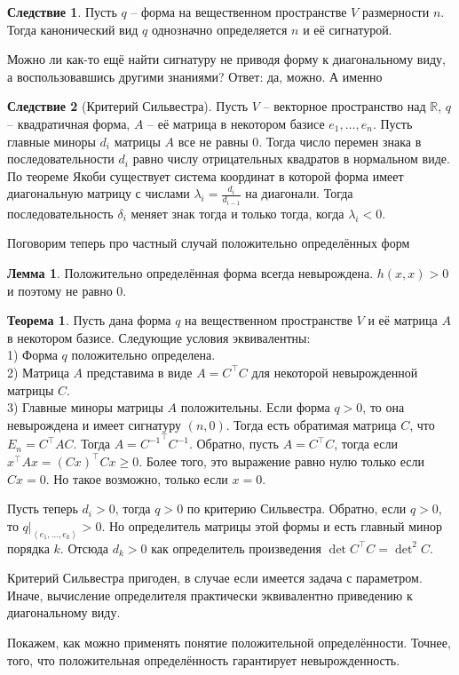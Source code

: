 \documentclass[10pt,a4paper,oneside]{book}
\theoremstyle{definition}
\newtheorem{thm}{Теорема}
\newtheorem{lem}{Лемма}
\newtheorem{cor}{Следствие}
\newcommand{\mb}[1]{\mathbb{#1}}
\def\lan{\left\langle }
\def\ran{\right\rangle}
\def\thrm{\begin{thm}}
\def\ethrm{\end{thm}}
\def\lm{\begin{lem}}
\def\elm{\end{lem}}
\def\crl{\begin{cor}}
\def\ecrl{\end{cor}}
\begin{document}
\crl Пусть $q$ -- форма на вещественном пространстве  $V$ размерности $n$. Тогда канонический вид $q$ однозначно определяется $n$ и её  сигнатурой. 
\ecrl

Можно ли как-то ещё найти сигнатуру не приводя форму к диагональному виду, а воспользовавшись другими знаниями? Ответ: да, можно. А именно

\crl[Критерий Сильвестра]
Пусть $V$ -- векторное пространство над $\mb R$, $q$ -- квадратичная форма, $A$ -- её матрица в некотором базисе $e_1,\dots,e_n$. Пусть главные миноры  $d_i$ матрицы $A$ все не равны $0$. Тогда число перемен знака в последовательности $d_i$ равно числу отрицательных квадратов в нормальном виде.
\proof По теореме Якоби существует система координат в которой форма имеет диагональную матрицу с числами $\lambda_i=\frac{d_i}{d_{i-1}}$ на диагонали. Тогда последовательность $\delta_i$ меняет знак тогда и только тогда, когда $\lambda_i<0$.
\endproof
\ecrl

Поговорим теперь про частный случай положительно определённых форм


\lm Положительно определённая форма всегда невырождена.
\proof $h(x,x)>0$ и поэтому не равно 0.
\endproof
\elm

\thrm
Пусть дана форма $q$ на вещественном пространстве $V$ и её матрица $A$ в некотором базисе. Следующие условия эквивалентны:\\
1) Форма $q$ положительно определена.\\
2) Матрица $A$ представима в виде $A=C^{\top}C$ для некоторой невырожденной матрицы $C$.\\
3) Главные миноры матрицы $A$ положительны.
\proof
Если форма $q>0$, то она невырождена и имеет сигнатуру $(n,0)$. Тогда есть обратимая матрица $C$,  что $E_n=C^{\top}AC$. Тогда $A={C^{-1}}^{\top}C^{-1}$. Обратно, пусть $A=C^{\top}C$, тогда если $x^{\top}Ax=(Cx)^{\top}Cx\geq 0$. Более того, это выражение равно нулю только если $Cx=0$. Но такое возможно, только если $x=0$.


Пусть теперь $d_i>0$, тогда $q>0$ по критерию Сильвестра. Обратно, если $q>0$, то $q|_{\lan e_1,\dots,e_k\ran} >0$. Но определитель матрицы этой формы и есть главный минор порядка $k$. Отсюда $d_k>0$ как определитель произведения $\det C^{\top}C=\det^2 C$.
\endproof
\ethrm

Критерий Сильвестра пригоден, в случае если имеется задача с параметром. Иначе, вычисление определителя практически эквивалентно приведению к диагональному виду. 

Покажем, как можно применять понятие положительной определённости. Точнее, того, что положительная определённость гарантирует невырожденность.
\end{document}
